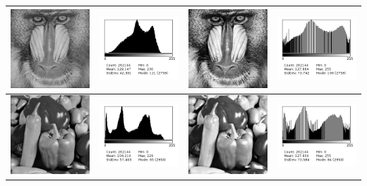 \documentclass[a4paper,11pt]{article}
\begin{document}
\begin{tabular}{|c|c|c|c|}
   \hline
   \includegraphics[width=3cm]{mandrill.png} & \includegraphics[width=3cm]{../histo/image/hist_mandrill.png} & \includegraphics[width=3cm]{../res/mandrillQ3.png} & \includegraphics[width=3cm]{../histo/resultat/mandrillQ3.png}\\
   \hline
   \includegraphics[width=3cm]{peppers.png} & \includegraphics[width=3cm]{../histo/image/hist_peppers.png} & \includegraphics[width=3cm]{../res/peppersQ3.png} & \includegraphics[width=3cm]{../histo/resultat/peppersQ3.png}\\
   \hline
  \end{tabular}\\
  
\end{document}
